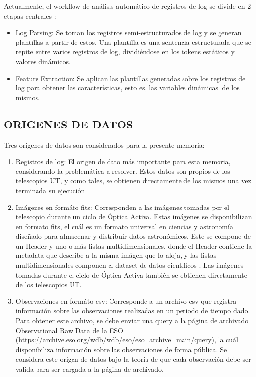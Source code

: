 Actualmente, el workflow de análisis automático de registros de log se divide en 2 etapas centrales \cite{ma2023automatic}:

\begin{itemize}
    \item Log Parsing: Se toman los registros semi-estructurados de log y se generan plantillas a partir de estos. Una plantilla es una sentencia estructurada que se repite entre varios registros de log, dividiéndose en los tokens estáticos y valores dinámicos. \cite{ma2023automatic}

    \item Feature Extraction: Se aplican las plantillas generadas sobre los registros de log para obtener las características, esto es, las variables dinámicas, de los mismos. \cite{ma2023automatic}

\end{itemize}

\subsection{ORIGENES DE DATOS}

Tres origenes de datos son considerados para la presente memoria:

\begin{enumerate}
    \item Registros de log: El origen de dato más importante para esta memoria, considerando la problemática a resolver. Estos datos son propios de los telescopios UT, y como tales, se obtienen directamente de los mismos una vez terminada su ejecución \cite{eso1998vlt}

    \item Imágenes en formáto fits: Corresponden a las imágenes tomadas por el telescopio durante un ciclo de Óptica Activa. Estas imágenes se disponibilizan en formato fits, el cuál es un formato universal en ciencias y astronomía diseñado para almacenar y distribuir datos astronómicos. Este se compone de un Header y uno o más listas multidimensionales, donde el Header contiene la metadata que describe a la misma imágen que lo aloja, y las listas multidimensionales componen el dataset de datos científicos \cite{nasa2025fits}. Las imágenes tomadas durante el ciclo de Óptica Activa también se obtienen directamente de los telescopios UT.

    \item Observaciones en formáto csv: Corresponde a un archivo csv que registra información sobre las observaciones realizadas en un periodo de tiempo dado. Para obtener este archivo, se debe enviar una query a la página de archivado Observational Raw Data de la ESO (https://archive.eso.org/wdb/wdb/eso/eso\_archive\_main/query), la cuál disponibiliza información sobre las observaciones de forma pública. Se considera este origen de datos bajo la teoría  de que cada observación debe ser valida para ser cargada a la página de archivado.
\end{enumerate}